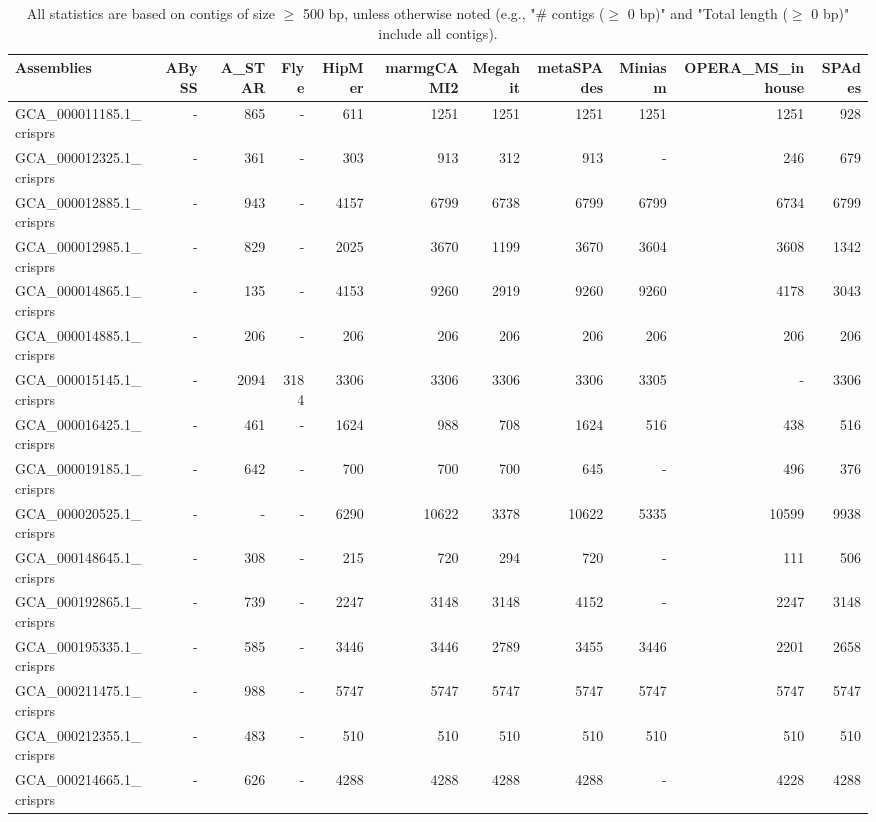 \documentclass[12pt,a4paper]{article}
\begin{document}
\begin{table}[ht]
\begin{center}
\caption{All statistics are based on contigs of size $\geq$ 500 bp, unless otherwise noted (e.g., "\# contigs ($\geq$ 0 bp)" and "Total length ($\geq$ 0 bp)" include all contigs).}
\begin{tabular}{|l*{10}{|r}|}
\hline
Assemblies & ABySS & A\_STAR & Flye & HipMer & marmgCAMI2 & Megahit & metaSPAdes & Miniasm & OPERA\_MS\_inhouse & SPAdes \\ \hline
GCA\_000011185.1\_crisprs & - & 865 & - & 611 & 1251 & 1251 & 1251 & 1251 & 1251 & 928 \\ \hline
GCA\_000012325.1\_crisprs & - & 361 & - & 303 & 913 & 312 & 913 & - & 246 & 679 \\ \hline
GCA\_000012885.1\_crisprs & - & 943 & - & 4157 & 6799 & 6738 & 6799 & 6799 & 6734 & 6799 \\ \hline
GCA\_000012985.1\_crisprs & - & 829 & - & 2025 & 3670 & 1199 & 3670 & 3604 & 3608 & 1342 \\ \hline
GCA\_000014865.1\_crisprs & - & 135 & - & 4153 & 9260 & 2919 & 9260 & 9260 & 4178 & 3043 \\ \hline
GCA\_000014885.1\_crisprs & - & 206 & - & 206 & 206 & 206 & 206 & 206 & 206 & 206 \\ \hline
GCA\_000015145.1\_crisprs & - & 2094 & 3184 & 3306 & 3306 & 3306 & 3306 & 3305 & - & 3306 \\ \hline
GCA\_000016425.1\_crisprs & - & 461 & - & 1624 & 988 & 708 & 1624 & 516 & 438 & 516 \\ \hline
GCA\_000019185.1\_crisprs & - & 642 & - & 700 & 700 & 700 & 645 & - & 496 & 376 \\ \hline
GCA\_000020525.1\_crisprs & - & - & - & 6290 & 10622 & 3378 & 10622 & 5335 & 10599 & 9938 \\ \hline
GCA\_000148645.1\_crisprs & - & 308 & - & 215 & 720 & 294 & 720 & - & 111 & 506 \\ \hline
GCA\_000192865.1\_crisprs & - & 739 & - & 2247 & 3148 & 3148 & 4152 & - & 2247 & 3148 \\ \hline
GCA\_000195335.1\_crisprs & - & 585 & - & 3446 & 3446 & 2789 & 3455 & 3446 & 2201 & 2658 \\ \hline
GCA\_000211475.1\_crisprs & - & 988 & - & 5747 & 5747 & 5747 & 5747 & 5747 & 5747 & 5747 \\ \hline
GCA\_000212355.1\_crisprs & - & 483 & - & 510 & 510 & 510 & 510 & 510 & 510 & 510 \\ \hline
GCA\_000214665.1\_crisprs & - & 626 & - & 4288 & 4288 & 4288 & 4288 & - & 4228 & 4288 \\ \hline

\end{tabular}
\end{center}
\end{table}
\end{document}

